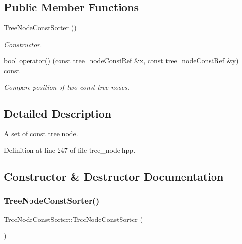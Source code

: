 \subsection*{Public Member Functions}
\begin{DoxyCompactItemize}
\item 
\hyperlink{classTreeNodeConstSorter_aff59ff6b9361f9ba0d86860f9e525f98}{Tree\+Node\+Const\+Sorter} ()
\begin{DoxyCompactList}\small\item\em Constructor. \end{DoxyCompactList}\item 
bool \hyperlink{classTreeNodeConstSorter_a42292eb5fe44085fd0653313cbb89bc0}{operator()} (const \hyperlink{tree__node_8hpp_a3cf5d02292c940f3892425a5b5fdec3c}{tree\+\_\+node\+Const\+Ref} \&x, const \hyperlink{tree__node_8hpp_a3cf5d02292c940f3892425a5b5fdec3c}{tree\+\_\+node\+Const\+Ref} \&y) const
\begin{DoxyCompactList}\small\item\em Compare position of two const tree nodes. \end{DoxyCompactList}\end{DoxyCompactItemize}


\subsection{Detailed Description}
A set of const tree node. 

Definition at line 247 of file tree\+\_\+node.\+hpp.



\subsection{Constructor \& Destructor Documentation}
\mbox{\label{classTreeNodeConstSorter_aff59ff6b9361f9ba0d86860f9e525f98}} 
\subsubsection{\texorpdfstring{Tree\+Node\+Const\+Sorter()}{TreeNodeConstSorter()}}
{\footnotesize\ttfamily Tree\+Node\+Const\+Sorter\+::\+Tree\+Node\+Const\+Sorter (\begin{DoxyParamCaption}{ }\end{DoxyParamCaption})}



